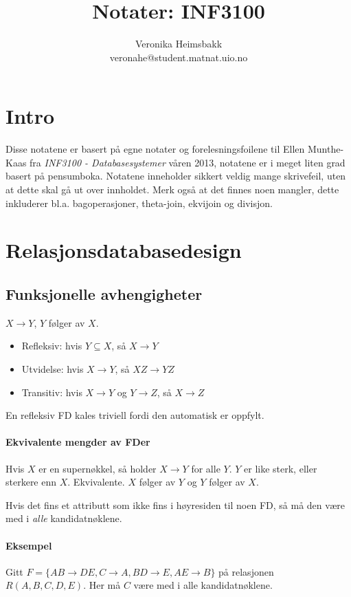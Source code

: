 \documentclass[12pt,a4paper]{article}
\title{Notater: INF3100}
\author{Veronika Heimsbakk \\ 
veronahe@student.matnat.uio.no}
\begin{document}
\maketitle{}
\tableofcontents
\newpage{}

\section{Intro}
Disse notatene er basert på egne notater og forelesningsfoilene til Ellen Munthe-Kaas fra \textit{INF3100 - Databasesystemer} våren 2013, notatene er i meget liten grad basert på pensumboka. Notatene inneholder sikkert veldig mange skrivefeil, uten at dette skal gå ut over innholdet. Merk også at det finnes noen mangler, dette inkluderer bl.a. bagoperasjoner, theta-join, ekvijoin og divisjon.

\section{Relasjonsdatabasedesign}
\subsection{Funksjonelle avhengigheter}
$X \rightarrow Y$, $Y$ følger av $X$.

\begin{itemize}
\item{Refleksiv: hvis $Y \subseteq X$, så $X \rightarrow Y$}
\item{Utvidelse: hvis $X \rightarrow Y$, så $XZ \rightarrow YZ$}
\item{Transitiv: hvis $X \rightarrow Y$ og $Y \rightarrow Z$, så $X \rightarrow Z$}
\end{itemize}

En refleksiv FD kales triviell fordi den automatisk er oppfylt.

\paragraph{Ekvivalente mengder av FDer} Hvis $X$ er en supernøkkel, så holder $X \rightarrow Y$ for alle $Y$.
$Y$ er like sterk, eller sterkere enn $X$. Ekvivalente. $X$ følger av $Y$ og $Y$ følger av $X$.

Hvis det fins et attributt som ikke fins i høyresiden til noen FD, så må den være med i \textit{alle} kandidatnøklene.

\paragraph{Eksempel}
Gitt $F = \{AB \rightarrow DE, C \rightarrow A, BD \rightarrow E, AE \rightarrow B\}$ på relasjonen $R(A, B, C, D, E)$. Her må $C$ være med i alle kandidatnøklene.
\end{document}
